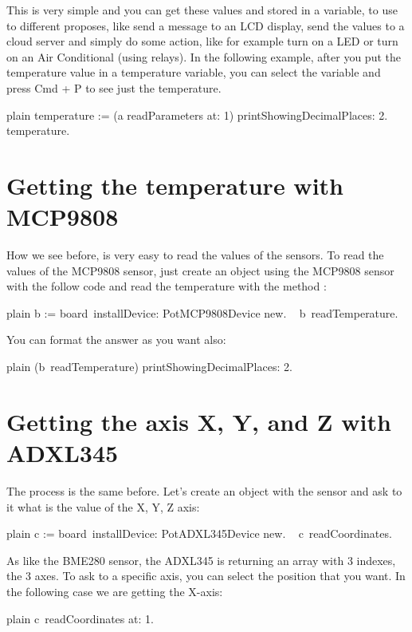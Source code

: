 \documentclass[10pt,twoside,english]{_support/latex/sbabook/sbabook}
\begin{document}
This is very simple and you can get these values and stored in a variable, to use to different proposes, like send a message to an LCD display, send the values to a cloud server and simply do some action, like for example turn on a LED or turn on an Air Conditional (using relays). In the following example, after you put the temperature value in a temperature variable, you can select the variable and press Cmd + P to see just the temperature. 

\begin{displaycode}{plain}
temperature := (a readParameters at: 1) printShowingDecimalPlaces: 2.
temperature.
\end{displaycode}
\section{Getting the temperature with MCP9808}
How we see before, is very easy to read the values of the sensors. To read the values of the MCP9808 sensor, just create an object using the MCP9808 sensor with the follow code and read the temperature with the method :

\begin{displaycode}{plain}
b := board installDevice: PotMCP9808Device new. ​ 
b readTemperature.  
\end{displaycode}

You can format the answer as you want also:

\begin{displaycode}{plain}
(b readTemperature) printShowingDecimalPlaces: 2.
\end{displaycode}
\section{Getting the axis X, Y, and Z with ADXL345}
The process is the same before. Let's create an object with the sensor and ask to it what is the value of the X, Y, Z axis:

\begin{displaycode}{plain}
c := board installDevice: PotADXL345Device new. ​ 
c readCoordinates. 
\end{displaycode}

As like the BME280 sensor, the ADXL345 is returning an array with 3 indexes, the 3 axes. To ask to a specific axis, you can select the position that you want. In the following case we are getting the X-axis:

\begin{displaycode}{plain}
c readCoordinates at: 1.
\end{displaycode}
\end{document}
